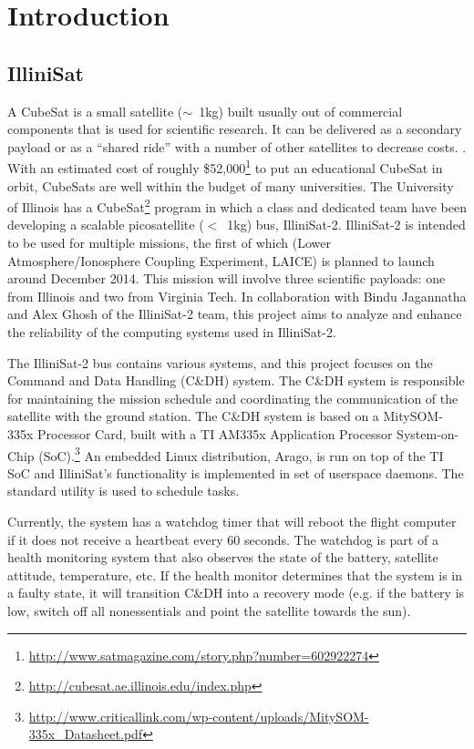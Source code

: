 \section{Introduction}
\subsection{IlliniSat}
A CubeSat is a small satellite ($\sim$~1kg) built usually out of commercial components
that is used for scientific research. It can be delivered as a secondary payload or 
as a ``shared ride'' with a number of other satellites to decrease costs.
\cite{toorian2008cubesat}.  
With an estimated cost of roughly
\$52,000\footnote{\url{http://www.satmagazine.com/story.php?number=602922274}}
to put an educational CubeSat in orbit, CubeSats are well within the budget of
many universities.  The University of Illinois has a
CubeSat\footnote{\url{http://cubesat.ae.illinois.edu/index.php}} program in
which a class and dedicated team have been developing a scalable picosatellite
($<$~1kg) bus, IlliniSat-2.  IlliniSat-2 is intended to be used for multiple
missions, the first of which (Lower Atmosphere/Ionosphere Coupling Experiment,
LAICE) is planned to launch around December 2014.  This mission will involve
three scientific payloads: one from Illinois and two from Virginia Tech.  In
collaboration with Bindu Jagannatha and Alex Ghosh of the IlliniSat-2 team, this
project aims to analyze and enhance the reliability of the computing systems
used in IlliniSat-2.

The IlliniSat-2 bus contains various systems, and this project focuses on the
Command and Data Handling (C\&DH) system.  The C\&DH system is responsible
for maintaining the mission schedule and coordinating the communication of the
satellite with the ground station.  The C\&DH system is based on a MitySOM-335x
Processor Card, built with a TI AM335x Application Processor System-on-Chip
(SoC).\footnote{\url{http://www.criticallink.com/wp-content/uploads/MitySOM-335x_Datasheet.pdf}}
An embedded Linux distribution, Arago, is run on top of the TI SoC and
IlliniSat's functionality is implemented in set of userspace daemons. The
standard  utility is used to schedule tasks.

Currently, the system has a watchdog timer that will reboot the flight computer
if it does not receive a heartbeat every 60 seconds.  The watchdog is part of a
health monitoring system that also observes the state of the battery, satellite 
attitude, temperature, etc. If the health monitor determines that the system
is in a faulty state, it will transition C\&DH into a recovery mode (e.g. if the
battery is low, switch off all nonessentials and point the satellite towards the
sun).

